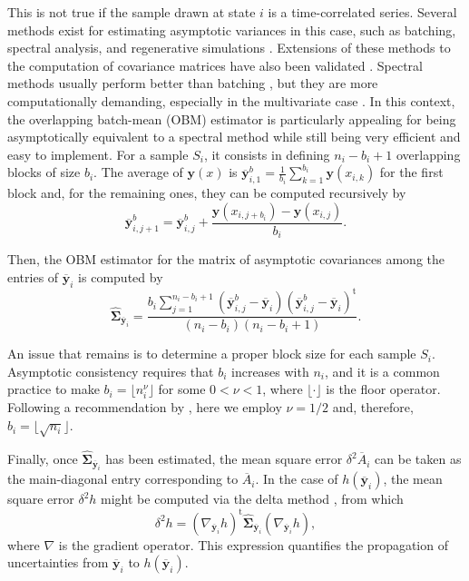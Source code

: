 \documentclass[journal=jctcce,manuscript=article,layout=twocolumn]{achemso}
\newcommand{\mt}[1]{\boldsymbol{\mathbf{#1}}}   %
\newcommand{\vt}[1]{\boldsymbol{\mathbf{#1}}}   %
\newcommand{\tr}[1]{#1^\text{t}}                %
\newcommand{\avg}[1]{\overline{#1}}             %
\begin{document}
This is not true if the sample drawn at state $i$ is a time-correlated series. Several methods exist for estimating asymptotic variances in this case, such as batching, spectral analysis, and regenerative simulations \cite{Geyer_1992, Alexopoulos_2006, Flegal_2010, Doss_2014}. Extensions of these methods to the computation of covariance matrices have also been validated \cite{Vats_2015, Vats_2018}. Spectral methods usually perform better than batching \cite{Flegal_2010}, but they are more computationally demanding, especially in the multivariate case \cite{Vats_2015}. In this context, the overlapping batch-mean (OBM) estimator \cite{Meketon_1984} is particularly appealing for being asymptotically equivalent to a spectral method while still being very efficient and easy to implement. For a sample $S_i$, it consists in defining $n_i-b_i+1$ overlapping blocks of size $b_i$. The average of $\vt y(x)$ is ${\avg{\vt y}}^b_{i,1} = \frac{1}{b_i} \sum_{k=1}^{b_i} \vt y(x_{i,k})$ for the first block and, for the remaining ones, they can be computed recursively by
\begin{equation*}
{\avg{\vt y}}^b_{i,j+1} = {\avg{\vt y}}^b_{i,j} + \frac{\vt y(x_{i,j+b_i}) - \vt y(x_{i,j})}{b_i}.
\end{equation*}

Then, the OBM estimator for the matrix of asymptotic covariances among the entries of $\avg{\vt y}_i$ is computed by \cite{Meketon_1984}
\begin{equation}
\label{eq:obm asymptotic covariance}
\hat{\mt \Sigma}_{\avg{\vt y}_i} = \frac{b_i \sum\limits_{j=1}^{n_i - b_i + 1} ({\avg{\vt y}}^b_{i,j} - \avg{\vt y}_i) \tr{({\avg{\vt y}}^b_{i,j} - \avg{\vt y}_i)}}{(n_i - b_i)(n_i - b_i + 1)}.
\end{equation}

An issue that remains is to determine a proper block size for each sample $S_i$. Asymptotic consistency requires that $b_i$ increases with $n_i$, and it is a common practice to make $b_i = \lfloor n_i^\nu \rfloor$ for some $0 < \nu < 1$, where $\lfloor \cdot \rfloor$ is the floor operator. Following a recommendation by \citeauthor{Flegal_2010} \cite{Flegal_2010}, here we employ $\nu = 1/2$ and, therefore, $b_i = \lfloor \sqrt{n_i} \rfloor$.

Finally, once $\hat{\mt \Sigma}_{\avg{\vt y}_i}$ has been estimated, the mean square error $\delta^2 \avg A_i$ can be taken as the main-diagonal entry corresponding to $\avg A_i$. In the case of $h(\avg{\vt y}_i)$, the mean square error $\delta^2 h$ might be computed via the delta method \cite{Greene_2012}, from which
\begin{equation}
\label{eq:delta method}
\delta^2 h = \tr{(\nabla_{\avg{\vt y}_i} h)} \hat{\mt \Sigma}_{\avg{\vt y}_i}(\nabla_{\avg{\vt y}_i} h),
\end{equation}
where $\nabla$ is the gradient operator. This expression quantifies the propagation of uncertainties from $\avg{\vt y}_i$ to $h(\avg{\vt y}_i)$.
\end{document}
